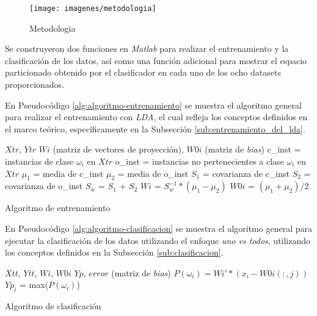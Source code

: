 \documentclass[journal]{IEEEtran}
\begin{document}
\begin{figure} [ht]
\centering 
\texttt{[image: imagenes/metodologia]}
\caption{Metodologia}
\label{fig:metodologia}
\end{figure}

Se construyeron dos funciones en \emph{Matlab} para realizar el entrenamiento y la clasificación de los datos, así como una función adicional para mostrar el espacio particionado obtenido por el clasificador en cada uno de los ocho datasets proporcionados.

En Pseudocódigo \ref{alg:algoritmo-entrenamiento} se muestra el algoritmo general para realizar el entrenamiento con \emph{LDA}, el cual refleja los conceptos definidos en el marco teórico, específicamente en la Subsección \ref{sub:entrenamiento_del_lda}.


\begin{algorithm} 
\footnotesize
\begin{algorithmic}[1] 
\REQUIRE  $Xtr$, $Ytr$
\ENSURE $Wi$ (matriz de vectores de proyección), $W0i$ (matriz de \emph{bias})
\STATE c\_inst = instancias de clase $\omega_i$ en $Xtr$
\STATE o\_inst = instancias no pertenecientes a clase $\omega_i$ en $Xtr$
\STATE $\mu_1$ = media de c\_inst
\STATE $\mu_2$ = media de o\_inst
\STATE $S_1$ = covarianza de c\_inst
\STATE $S_2$ = covarianza de o\_inst
\STATE $S_w$ = $S_1$ + $S_2$
\STATE $Wi$ = $S_w^{-1}*(\mu_1 - \mu_2)$
\STATE $W0i$ = $(\mu_1 + \mu_2)/2$
\ENDFOR
\end{algorithmic} 
\caption{Algoritmo de entrenamiento} 
\label{alg:algoritmo-entrenamiento}
\end{algorithm}

En Pseudocódigo \ref{alg:algoritmo-clasificacion} se muestra el algoritmo general para ejecutar la clasificación de los datos utilizando el enfoque \emph{uno vs todos}, utilizando los conceptos definidos en la Subsección \ref{sub:clasificacion}.


\begin{algorithm} 
\footnotesize
\begin{algorithmic}[1] 
\REQUIRE  $Xtt$, $Ytt$, $Wi$, $W0i$
\ENSURE $Yp$, $error$ (matriz de \emph{bias})
\STATE $P(\omega_i) = Wi' * ( x_i - W0i(:,j) )$
\ENDFOR
\STATE $Yp_i$ = max($P(\omega_i)$)
\ENDFOR
\end{algorithmic} 
\caption{Algoritmo de clasificación} 
\label{alg:algoritmo-clasificacion}
\end{algorithm}
\end{document}
